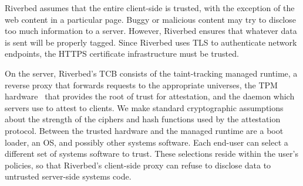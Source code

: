 Riverbed assumes that the entire client-side is trusted,
with the exception of the web content in a particular
page. Buggy or malicious content may try to disclose
too much information to a server. However, Riverbed
ensures that whatever data is sent will be properly tagged.
Since Riverbed uses TLS to authenticate network endpoints,
the HTTPS certificate infrastructure must be trusted.

On the server, Riverbed's TCB consists of the taint-tracking
managed runtime, a reverse proxy that forwards requests to
the appropriate universes, the TPM
hardware~\cite{tpmchip} that provides the root of trust for attestation,
and the daemon which servers use to attest to clients. We make
standard cryptographic assumptions about the strength of the
ciphers and hash functions used by the attestation protocol.
Between the trusted hardware and the managed runtime are a boot
loader, an OS, and possibly other systems software. Each end-user
can select a different set of systems software to trust. These
selections reside within the user's policies,
so that Riverbed's client-side proxy can refuse to disclose data
to untrusted server-side systems code.
